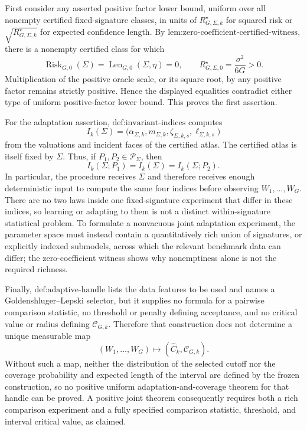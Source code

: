First consider any asserted positive factor lower bound, uniform over all nonempty certified fixed-signature classes, in units of \(R_{G,\Sigma,k}^{\star}\) for squared risk or \(\sqrt{R_{G,\Sigma,k}^{\star}}\) for expected confidence length. By \(\text{lem:zero-coefficient-certified-witness}\), there is a nonempty certified class for which
\[
 \operatorname{Risk}_{G,0}(\Sigma)
 =\operatorname{Len}_{G,0}(\Sigma,\eta)=0,
 \qquad
 R_{G,\Sigma,0}^{\star}=\frac{\sigma^2}{6G}>0.
\]
Multiplication of the positive oracle scale, or its square root, by any positive factor remains strictly positive. Hence the displayed equalities contradict either type of uniform positive-factor lower bound. This proves the first assertion.

For the adaptation assertion, \(\text{def:invariant-indices}\) computes
\[
 I_k(\Sigma)
 =\bigl(\alpha_{\Sigma,k},m_{\Sigma,k},
          \zeta_{\Sigma,k,s},\ell_{\Sigma,k,s}\bigr)
\]
from the valuations and incident faces of the certified atlas. The certified atlas is itself fixed by \(\Sigma\). Thus, if \(P_1,P_2\in\mathcal P_\Sigma\), then
\[
 I_k(\Sigma;P_1)=I_k(\Sigma)=I_k(\Sigma;P_2).
\]
In particular, the procedure receives \(\Sigma\) and therefore receives enough deterministic input to compute the same four indices before observing \(W_1,\ldots,W_G\). There are no two laws inside one fixed-signature experiment that differ in these indices, so learning or adapting to them is not a distinct within-signature statistical problem. To formulate a nonvacuous joint adaptation experiment, the parameter space must instead contain a quantitatively rich union of signatures, or explicitly indexed submodels, across which the relevant benchmark data can differ; the zero-coefficient witness shows why nonemptiness alone is not the required richness.

Finally, \(\text{def:adaptive-handle}\) lists the data features to be used and names a Goldenshluger--Lepski selector, but it supplies no formula for a pairwise comparison statistic, no threshold or penalty defining acceptance, and no critical value or radius defining \(\mathcal C_{G,k}\). Therefore that construction does not determine a unique measurable map
\[
 (W_1,\ldots,W_G)\longmapsto
 (\widehat C_k,\mathcal C_{G,k}).
\]
Without such a map, neither the distribution of the selected cutoff nor the coverage probability and expected length of the interval are defined by the frozen construction, so no positive uniform adaptation-and-coverage theorem for that handle can be proved. A positive joint theorem consequently requires both a rich comparison experiment and a fully specified comparison statistic, threshold, and interval critical value, as claimed.